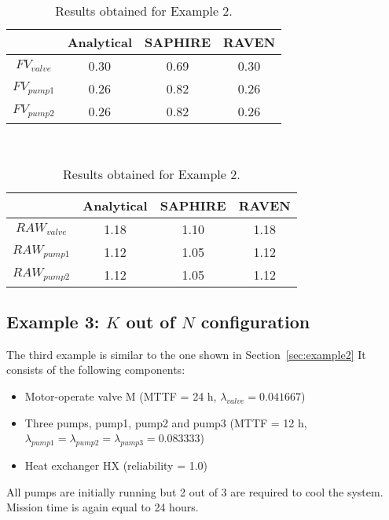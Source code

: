 \begin{table}
    \centering
    \caption{Results obtained for Example 2.}
    \begin{minipage}{.5\linewidth}
      \centering
      \begin{tabular}{c | c | c | c} 
        \hline 
         & Analytical & SAPHIRE & RAVEN \\ 
        \hline 
        $FV_{valve}$ & 0.30 & 0.69 & 0.30 \\
        $FV_{pump1}$ & 0.26 & 0.82 & 0.26 \\
        $FV_{pump2}$ & 0.26 & 0.82 & 0.26 \\
        \hline 
      \end{tabular}
    \end{minipage} \\[2ex]
    \begin{minipage}{.5\linewidth}
      \centering
      \begin{tabular}{c | c | c | c} 
        \hline 
         & Analytical & SAPHIRE & RAVEN \\ 
        \hline 
        $RAW_{valve}$ & 1.18 & 1.10 & 1.18 \\
        $RAW_{pump1}$ & 1.12 & 1.05 & 1.12 \\
        $RAW_{pump2}$ & 1.12 & 1.05 & 1.12 \\
        \hline 
      \end{tabular}
    \end{minipage} 
    \label{tab:example2}
\end{table}


\subsection{Example 3: $K$ out of $N$ configuration}
\label{sec:example3}

The third example is similar to the one shown in Section~\ref{sec:example2}
It consists of the following components:
\begin{itemize}
  \item Motor-operate valve M (MTTF = 24 h, $\lambda_{valve} = 0.041667$)
  \item Three pumps, pump1, pump2 and pump3 
        (MTTF = 12 h, $\lambda_{pump1} = \lambda_{pump2} = \lambda_{pump3} = 0.083333$)
  \item Heat exchanger HX (reliability = 1.0)
\end{itemize}
All pumps are initially running but 2 out of 3 are required to cool the system.
Mission time is again equal to 24 hours.

